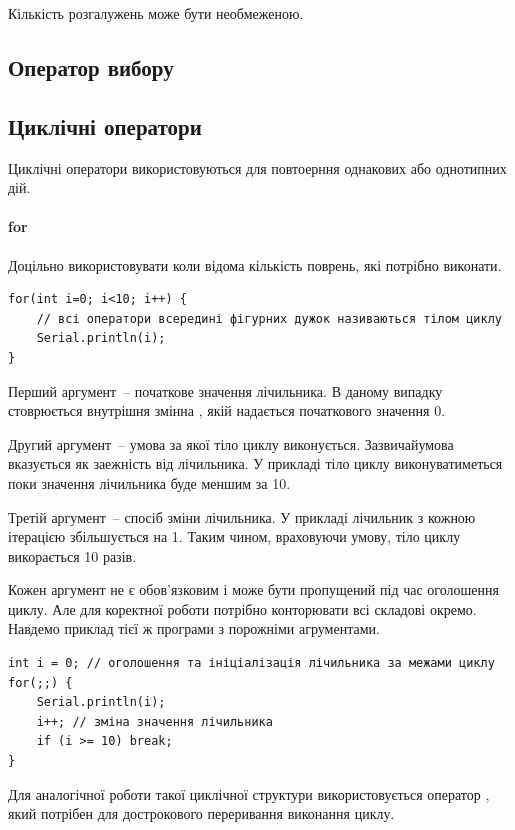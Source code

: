 \documentclass[12pt,a4paper]{report}  %
\begin{document}
Кількість розгалужень може бути необмеженою.

\subsection{Оператор вибору}


\subsection{Циклічні оператори}
Циклічні оператори використовуються для повтоерння однакових або однотипних дій.

\paragraph{for}

Доцільно використовувати коли відома кількість поврень, які потрібно виконати.

\begin{lstlisting}[label=conditionoperator,caption=Оператор повторення for]
for(int i=0; i<10; i++) {
	// всі оператори всередині фігурних дужок називаються тілом циклу
	Serial.println(i);
}
\end{lstlisting}

Перший аргумент~-- початкове значення лічильника. В даному випадку стоврюється внутрішня змінна , якій надається початкового значення 0.

Другий аргумент~-- умова за якої тіло циклу виконується. Зазвичайумова вказується як заежність від лічильника. У прикладі тіло циклу виконуватиметься поки значення лічильника буде меншим за 10.

Третій аргумент~-- спосіб зміни лічильника. У прикладі лічильник з кожною ітерацією збільшується на 1. Таким чином, враховуючи умову, тіло циклу викорається 10 разів.

Кожен аргумент не є обов'язковим і може бути пропущений під час оголошення циклу. Але для коректної роботи потрібно конторювати всі складові окремо. Навдемо приклад тієї ж програми з порожніми агрументами.

\begin{lstlisting}[label=conditionoperator,caption=Оператор повторення for]
int i = 0; // оголошення та ініціалізація лічильника за межами циклу
for(;;) {
	Serial.println(i);
	i++; // зміна значення лічильника
	if (i >= 10) break;
}
\end{lstlisting}

Для аналогічної роботи такої циклічної структури використовується оператор , який потрібен для дострокового переривання виконання циклу.
\end{document}
